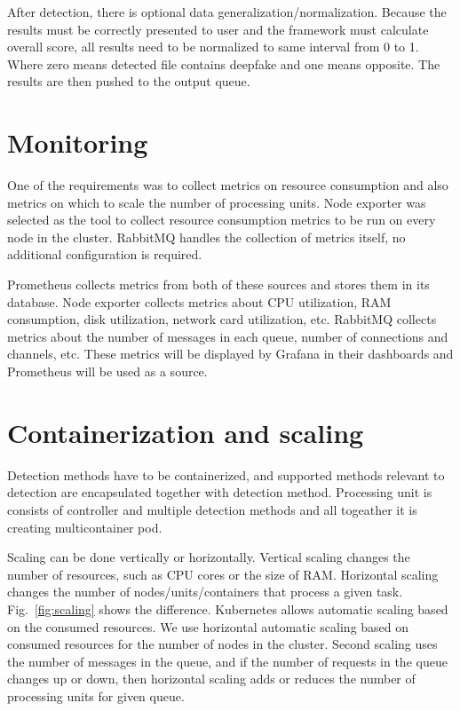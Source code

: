 After detection, there is optional data generalization/normalization. Because the results must be correctly presented to user and the framework must calculate overall score, all results need to be normalized to same interval from 0 to 1. Where zero means detected file contains deepfake and one means opposite. The results are then pushed to the output queue.

\section{Monitoring}

One of the requirements was to collect metrics on resource consumption and also metrics on which to scale the number of processing units. Node exporter was selected as the tool to collect resource consumption metrics to be run on every node in the cluster. RabbitMQ handles the collection of metrics itself, no additional configuration is required.

Prometheus collects metrics from both of these sources and stores them in its database. Node exporter collects metrics about CPU utilization, RAM consumption, disk utilization, network card utilization, etc. RabbitMQ collects metrics about the number of messages in each queue, number of connections and channels, etc. These metrics will be displayed by Grafana in their dashboards and Prometheus will be used as a source.

\section{Containerization and scaling}

Detection methods have to be containerized, and supported methods relevant to detection are encapsulated together with detection method. Processing unit is consists of controller and multiple detection methods and all togeather it is creating multicontainer pod.

Scaling can be done vertically or horizontally. Vertical scaling changes the number of resources, such as CPU cores or the size of RAM. Horizontal scaling changes the number of nodes/units/containers that process a given task. Fig.~\ref{fig:scaling} shows the difference. Kubernetes allows automatic scaling based on the consumed resources. We use horizontal automatic scaling based on consumed resources for the number of nodes in the cluster. Second scaling uses the number of messages in the queue, and if the number of requests in the queue changes up or down, then horizontal scaling adds or reduces the number of processing units for given queue.~\cite{Scaling}

